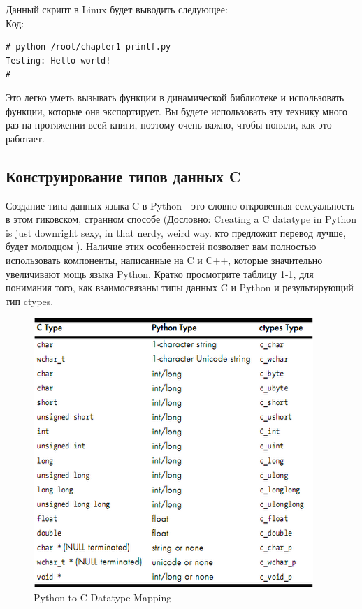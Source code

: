\documentclass[12pt, a4paper, oneside]{book}
\begin{document}
Данный скрипт в Linux будет выводить следующее:\\
Код:
\begin{verbatim}
# python /root/chapter1-printf.py
Testing: Hello world!
#
\end{verbatim}
Это легко уметь вызывать функции в динамической библиотеке и использовать функции, которые она экспортирует. Вы будете использовать эту технику много раз на протяжении всей книги, поэтому очень важно, чтобы поняли, как это работает.\\

\subsection{Конструирование типов данных C}

Создание типа данных языка C в Python - это словно откровенная сексуальность в этом гиковском, странном способе (Дословно: Creating a C datatype in Python is just downright sexy, in that nerdy, weird way. кто предложит перевод лучше, будет молодцом ). Наличие этих особенностей позволяет вам полностью использовать компоненты, написанные на C и C++, которые значительно увеличивают мощь языка Python. Кратко просмотрите таблицу 1-1, для понимания того, как взаимосвязаны типы данных C и Python и результирующий тип ctypes.\\

\begin{figure}
  \center
  \includegraphics{./pic/chap1/1.PNG}
  \caption{Python to C Datatype Mapping}
\end{figure}
\end{document}
